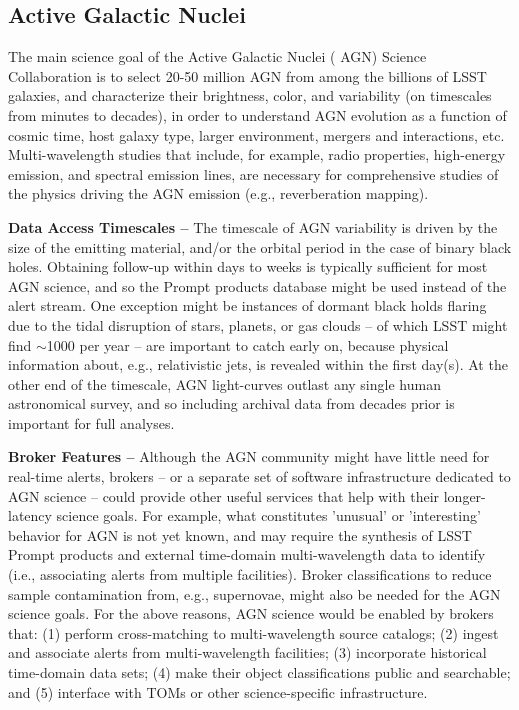 \subsection{Active Galactic Nuclei}\label{ssec:sci_agn}

The main science goal of the Active Galactic Nuclei ( {AGN})  {Science Collaboration} is to select 20-50 million  {AGN} from among the billions of  {LSST} galaxies, and characterize their brightness, color, and variability (on timescales from minutes to decades), in order to understand  {AGN} evolution as a function of cosmic time, host galaxy type, larger environment, mergers and interactions, etc.
Multi-wavelength studies that include, for example, radio properties, high-energy emission, and spectral emission lines, are necessary for comprehensive studies of the physics driving the  {AGN} emission (e.g., reverberation mapping).

{\bf Data Access Timescales --} 
The timescale of  {AGN} variability is driven by the size of the emitting material, and/or the orbital period in the case of binary black holes. 
Obtaining follow-up within days to weeks is typically sufficient for most  {AGN} science, and so the Prompt products database might be used instead of the alert stream.
One exception might be instances of dormant black holds flaring due to the tidal disruption of stars, planets, or gas clouds -- of which  {LSST} might find $\sim$1000 per year -- are important to catch early on, because physical information about, e.g., relativistic jets, is revealed within the first day(s).
At the other end of the timescale,  {AGN} light-curves outlast any single human astronomical survey, and so including archival data from decades prior is important for full analyses. 

{\bf  {Broker} Features --}
Although the  {AGN} community might have little need for real-time alerts, brokers -- or a separate set of software infrastructure dedicated to  {AGN} science -- could provide other useful services that help with their longer-latency science goals.
For example, what constitutes 'unusual' or 'interesting' behavior for  {AGN} is not yet known, and may require the synthesis of  {LSST} Prompt products and external time-domain multi-wavelength data to identify (i.e., associating alerts from multiple facilities).
Broker classifications to reduce sample contamination from, e.g., supernovae, might also be needed for the  {AGN} science goals.
For the above reasons,  {AGN} science would be enabled by brokers that:
(1) perform cross-matching to multi-wavelength source catalogs; 
(2) ingest and associate alerts from multi-wavelength facilities; 
(3) incorporate historical time-domain data sets; 
(4) make their object classifications public and searchable; and 
(5) interface with TOMs or other science-specific infrastructure.

